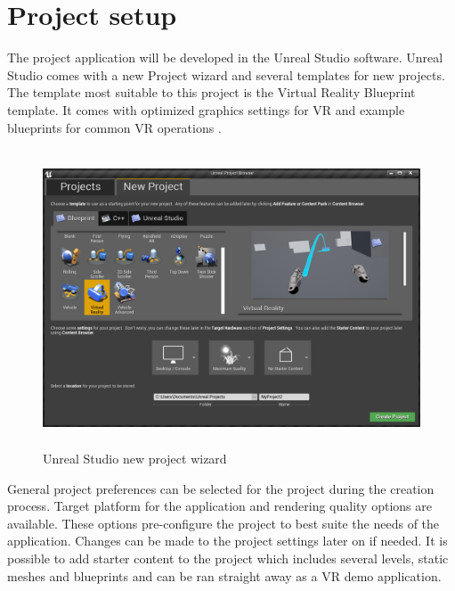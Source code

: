 \documentclass[12pt, a4paper,oneside, nocenter]{thesis}
\begin{document}
\section{Project setup}
The project application will be developed in the Unreal Studio software. Unreal Studio comes with a new Project wizard and several templates for new projects. The template most suitable to this project is the Virtual Reality Blueprint template. It comes with optimized graphics settings for VR and example blueprints for common VR operations .
\begin{figure}[H]
	\includegraphics[height=250pt]{new-project}
	\caption{Unreal Studio new project wizard}
	\label{fig:new-project}
\end{figure}
General project preferences can be selected for the project during the creation process. Target platform for the application and rendering quality options are available. These options pre-configure the project to best suite the needs of the application. Changes can be made to the project settings later on if needed. It is possible to add starter content to the project which includes several levels, static meshes and blueprints and can be ran straight away as a VR demo application.
\end{document}
